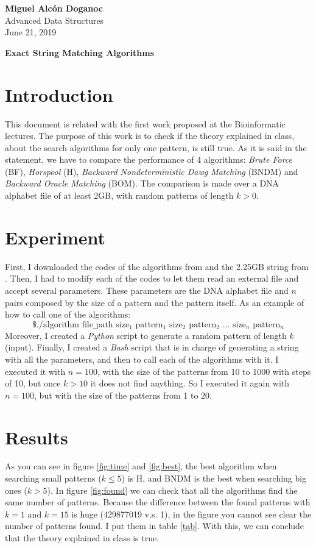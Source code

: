 \documentclass[a4paper, 10pt]{article}
\begin{document}
\noindent
\begin{flushright}
    \large\textbf{Miguel Alcón Doganoc} \\
    Advanced Data Structures \\
	June 21, 2019
\end{flushright}

\noindent
{\huge{\textbf{Exact String Matching Algorithms}}}

\section*{Introduction}
This document is related with the first work proposed at the Bioinformatic lectures. The purpose of this work is to check if the theory explained in class, about the search algorithms for only one pattern, is still true. As it is said in the statement, we have to compare the performance of 4 algorithms: \textit{Brute Force} (BF), \textit{Horspool} (H), \textit{Backward Nondeterministic Dawg Matching} (BNDM) and \textit{Backward Oracle Matching} (BOM). The comparison is made over a DNA alphabet file of at least 2GB, with random patterns of length $k > 0$.

\section*{Experiment}
First, I downloaded the codes of the algorithms from \cite{link} and the 2.25GB string from \cite{data}. Then, I had to modify each of the codes to let them read an external file and accept several parameters. These parameters are the DNA alphabet file and $n$ pairs composed by the size of a pattern and the pattern itself. As an example of how to call one of the algorithms:
\[
	\text{\$ ./algorithm file\_path size$_1$ pattern$_1$ size$_2$ pattern$_2$ ... size$_n$ pattern$_n$}
\]
Moreover, I created a \textit{Python} script to generate a random pattern of length $k$ (input). Finally, I created a \textit{Bash} script that is in charge of generating a string with all the parameters, and then to call each of the algorithms with it. I executed it with $n = 100$, with the size of the patterns from 10 to 1000 with steps of 10, but once $k > 10$ it does not find anything. So I executed it again with $n = 100$, but with the size of the patterns from 1 to 20.

\section*{Results}
As you can see in figure \ref{fig:time} and \ref{fig:best}, the best algorithm when searching small patterns ($k \leq 5$) is H, and BNDM is the best when searching big ones ($k > 5$). In figure \ref{fig:found} we can check that all the algorithms find the same number of patterns. Because the difference between the found patterns with $k = 1$ and $k = 15$ is huge (429877019 v.s. 1), in the figure you cannot see clear the number of patterns found. I put them in table \ref{tab}. With this, we can conclude that the theory explained in class is true.
\end{document}
